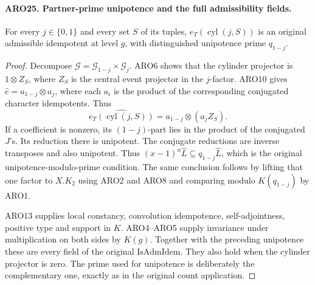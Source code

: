 \paragraph{ARO25. Partner-prime unipotence and the full admissibility fields.}
\label{claim:ARO25}
For every \(j\in\{0,1\}\) and every set \(S\) of its tuples,
\(e_T(\operatorname{cyl}(j,S))\) is an original admissible
idempotent at level \(g\), with distinguished unipotence prime
\(q_{1-j}\).
\begin{proof}
Decompose \(\mathcal G=\mathcal G_{1-j}\times\mathcal G_j\).
ARO6 shows that the cylinder projector is \(1\otimes Z_S\),
where \(Z_S\) is the central event projector in the \(j\)-factor.
ARO10 gives \(\widehat e=a_{1-j}\otimes a_j\), where each
\(a_i\) is the product of the corresponding conjugated character
idempotents.  Thus
\[
       \widehat{e_T(\operatorname{cyl}(j,S))}
                         =a_{1-j}\otimes(a_jZ_S).     \tag{ARO.28}
\]
If a coefficient is nonzero, its \((1-j)\)-part lies in the
product of the conjugated \(J\)'s.  Its reduction there is
unipotent.  The conjugate reductions are inverse transposes and
also unipotent.  Thus \((x-1)^n\widehat L\subseteq
q_{1-j}\widehat L\), which is the original unipotence-modulo-prime
condition.  The same conclusion follows by lifting that one
factor to \(X.K_2\) using ARO2 and ARO8 and comparing modulo
\(K(q_{1-j})\) by ARO1.

ARO13 supplies local constancy, convolution idempotence,
self-adjointness, positive type and support in \(K\).
ARO4--ARO5 supply invariance under multiplication on both sides
by \(K(g)\).  Together with the preceding unipotence these are
every field of the original \(\mathrm{IsAdmIdem}\).  They also
hold when the cylinder projector is zero.  The prime used for
unipotence is deliberately the complementary one, exactly as in
the original count application.
\end{proof}

